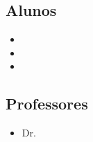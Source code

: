 

\subsection*{Alunos} %
\label{sub:alunos}
\begin{itemize}
	\item \carlos
	\item \luiz
	\item \rafael
\end{itemize}

\subsection*{Professores} %
\label{sub:professores}

\begin{itemize}
	\item Dr. \professor
\end{itemize}